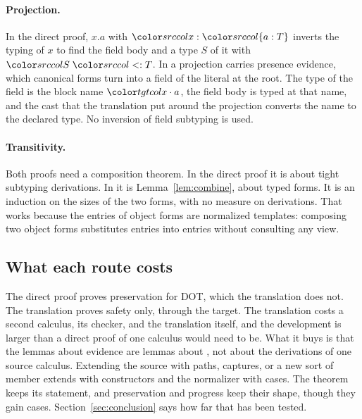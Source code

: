\paragraph{Projection.}
In the direct proof, $x.a$ with $\src{x : \dfld{a}{T}}$ inverts the typing of $x$ to find the field body and a type $S$ of it with $\src{S \sub T}$. In \FCdot a projection carries presence evidence, which canonical forms turn into a field of the literal at the root. The type of the field is the block name $\sel{x}{a}$, the field body is typed at that name, and the cast that the translation put around the projection converts the name to the declared type. No inversion of field subtyping is used.

\paragraph{Transitivity.}
Both proofs need a composition theorem. In the direct proof it is about tight subtyping derivations. In \FCdot it is Lemma~\ref{lem:combine}, about typed forms. It is an induction on the sizes of the two forms, with no measure on derivations. That works because the entries of object forms are normalized templates: composing two object forms substitutes entries into entries without consulting any view.

\subsection{What each route costs}

The direct proof proves preservation for DOT, which the translation does not. The translation proves safety only, through the target. The translation costs a second calculus, its checker, and the translation itself, and the development is larger than a direct proof of one calculus would need to be. What it buys is that the lemmas about evidence are lemmas about \FCdot, not about the derivations of one source calculus. Extending the source with paths, captures, or a new sort of member extends \FCdot with constructors and the normalizer with cases. The theorem keeps its statement, and preservation and progress keep their shape, though they gain cases. Section~\ref{sec:conclusion} says how far that has been tested.
